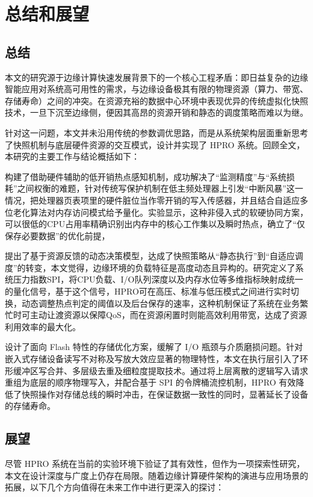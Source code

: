 
\chapter{总结和展望}

\section{总结}

本文的研究源于边缘计算快速发展背景下的一个核心工程矛盾：即日益复杂的边缘智能应用对系统高可用性的需求，与边缘设备极其有限的物理资源（算力、带宽、存储寿命）之间的冲突。在资源充裕的数据中心环境中表现优异的传统虚拟化快照技术，一旦下沉至边缘侧，便因其高昂的资源开销和静态的调度策略而难以为继。

针对这一问题，本文并未沿用传统的参数调优思路，而是从系统架构层面重新思考了快照机制与底层硬件资源的交互模式，设计并实现了 HPRO 系统。回顾全文，本研究的主要工作与结论概括如下：

构建了借助硬件辅助的低开销热点感知机制，成功解决了“监测精度”与“系统损耗”之间权衡的难题，针对传统写保护机制在低主频处理器上引发“中断风暴”这一情况，把处理器页表项里的硬件脏位当作零开销的写入传感器，并且结合自适应多位老化算法对内存访问模式给予量化。实验显示，这种非侵入式的软硬协同方案，可以很低的CPU占用率精确识别出内存中的核心工作集以及瞬时热点，确立了“仅保存必要数据”的优化前提，

提出了基于资源反馈的动态决策模型，达成了快照策略从“静态执行”到“自适应调度”的转变，本文觉得，边缘环境的负载特征是高度动态且异构的。研究定义了系统压力指数SPI，将CPU负载、I/O队列深度以及内存水位等多维指标映射成统一的量化信号，基于这个信号，HPRO可在高压、标准与低压模式之间进行实时切换，动态调整热点判定的阈值以及后台保存的速率，这种机制保证了系统在业务繁忙时可主动让渡资源以保障QoS，而在资源闲置时则能高效利用带宽，达成了资源利用效率的最大化。

设计了面向 Flash 特性的存储优化方案，缓解了 I/O 瓶颈与介质磨损问题。针对嵌入式存储设备读写不对称及写放大效应显著的物理特性，本文在执行层引入了环形缓冲区写合并、多层级去重及细粒度提取技术。通过将上层离散的逻辑写入请求重组为底层的顺序物理写入，并配合基于 SPI 的令牌桶流控机制，HPRO 有效降低了快照操作对存储总线的瞬时冲击，在保证数据一致性的同时，显著延长了设备的存储寿命。

\section{展望}

尽管 HPRO 系统在当前的实验环境下验证了其有效性，但作为一项探索性研究，本文在设计深度与广度上仍存在局限。随着边缘计算硬件架构的演进与应用场景的拓展，以下几个方向值得在未来工作中进行更深入的探讨：

